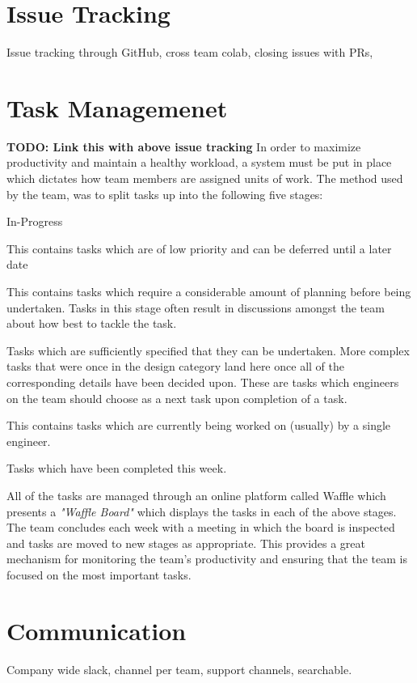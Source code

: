 \section{Issue Tracking}
Issue tracking through GitHub, cross team colab, closing issues with PRs, 

\section{Task Managemenet}
\textbf{TODO: Link this with above issue tracking}
In order to maximize productivity and maintain a healthy workload, a system must be put in place which dictates how team members are assigned units of work. The method used by the \team{} team, was to split tasks up into the following five stages:

\begin{labeling}{In-Progress}
	\item [Backlog] This contains tasks which are of low priority and can be deferred until a later date
	\item [Design] This contains tasks which require a considerable amount of planning before being undertaken. Tasks in this stage often result in discussions amongst the team about how best to tackle the task.
	\item [Ready] Tasks which are sufficiently specified that they can be undertaken. More complex tasks that were once in the design category land here once all of the corresponding details have been decided upon. These are tasks which engineers on the team should choose as a next task upon completion of a task.
	\item [In-Progress] This contains tasks which are currently being worked on (usually) by a single engineer.
	\item [Completed] Tasks which have been completed this week.
\end{labeling}

All of the tasks are managed through an online platform called Waffle\cite{waffle} which presents a \textit{"Waffle Board"} which displays the tasks in each of the above stages. The team concludes each week with a meeting in which the board is inspected and tasks are moved to new stages as appropriate. This provides a great mechanism for monitoring the team's productivity and ensuring that the team is focused on the most important tasks. 

\section{Communication}
Company wide slack, channel per team, support channels, searchable.

